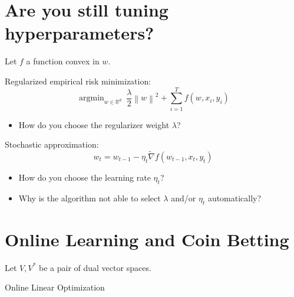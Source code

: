 \documentclass[30pt,landscape]{sciposter}
\DeclareMathOperator*{\argmin}{argmin}
\newcommand{\R}{\mathbb{R}}
\newcommand{\norm}[1]{\left\|#1\right\|}
\newcommand{\grad}{\nabla}
\begin{document}
\setlength{\parindent}{0em}
\setlength{\columnsep}{4cm}
\begin{multicols}{3}

\section*{Are you still tuning hyperparameters?}

Let $f$ a function convex in $w$.

Regularized empirical risk minimization:
$$
    \argmin_{w \in \R^d} \ \frac{\lambda}{2} \norm{w}^2 + \sum_{i=1}^T f(w, x_i, y_i)
$$
\begin{itemize}
\item How do you choose the regularizer weight $\lambda$?
\end{itemize}

\vspace{1cm}

Stochastic approximation:
$$
    w_t = w_{t-1} - \eta_t \widetilde{\grad} f(w_{t-1}, x_t, y_t)
$$
\begin{itemize}
\item How do you choose the learning rate $\eta_t$?
\end{itemize}

\vspace{1cm}

\begin{itemize}
\item Why is the algorithm not able to select $\lambda$ and/or $\eta_t$ automatically?
\end{itemize}

\section*{Online Learning and Coin Betting}

Let $V,V^*$ be a pair of dual vector spaces.

\vspace{1cm}

\setlength{\fboxrule}{5pt}
\setlength{\fboxsep}{10pt}
\begin{center}
Online Linear Optimization
\vspace{0.3cm}

\colorbox[rgb]{0.80,0.55,0.98}{}
\end{center}


\end{multicols}
\end{document}
